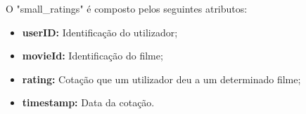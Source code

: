 O "small\_ratings"  é composto pelos seguintes atributos:

\begin{itemize}
    \item \textbf{userID:} Identificação do utilizador;
    \item \textbf{movieId:} Identificação do filme;
    \item \textbf{rating:} Cotação que um utilizador deu a um determinado filme;
    \item \textbf{timestamp:} Data da cotação.
\end{itemize}


\newpage